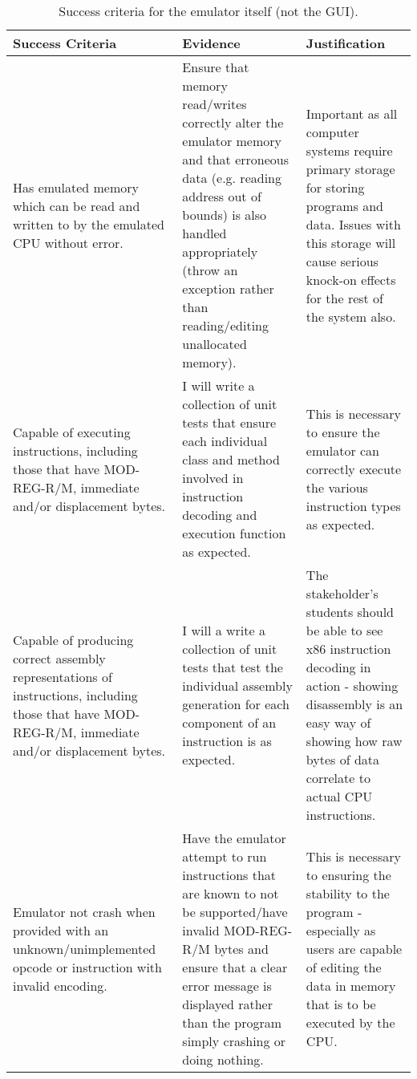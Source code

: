        \begin{table}
            \begin{tabular} { | m{} | m{} | m{} | }
                \hline
                \textbf{Success Criteria} & \textbf{Evidence} & \textbf{Justification} \\
                \hline
                Has emulated memory which can be read and written to by the emulated CPU without error. &
                Ensure that memory read/writes correctly alter the emulator memory and that erroneous data (e.g. reading address out of bounds) is also handled appropriately (throw an exception rather than reading/editing unallocated memory). &
                Important as all computer systems require primary storage for storing programs and data. Issues with this storage will cause serious knock-on effects for the rest of the system also. \\
                \hline
                Capable of executing instructions, including those that have MOD-REG-R/M, immediate and/or displacement bytes. &
                I will write a collection of unit tests that ensure each individual class and method involved in instruction decoding and execution function as expected. &
                This is necessary to ensure the emulator can correctly execute the various instruction types as expected. \\
                \hline
                Capable of producing correct assembly representations of instructions, including those that have MOD-REG-R/M, immediate and/or displacement bytes. &
                I will a write a collection of unit tests that test the individual assembly generation for each component of an instruction is as expected. &
                The stakeholder's students should be able to see x86 instruction decoding in action - showing disassembly is an easy way of showing how raw bytes of data correlate to actual CPU instructions. \\
                \hline
                Emulator not crash when provided with an unknown/unimplemented opcode or instruction with invalid encoding. &
                Have the emulator attempt to run instructions that are known to not be supported/have invalid MOD-REG-R/M bytes and ensure that a clear error message is displayed rather than the program simply crashing or doing nothing. &
                This is necessary to ensuring the stability to the program - especially as users are capable of editing the data in memory that is to be executed by the CPU. \\
                \hline
            \end{tabular}
            \caption{Success criteria for the emulator itself (not the GUI).}
            \label{table:emulator-success-criteria}
        \end{table}
